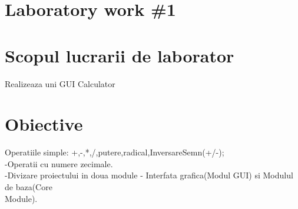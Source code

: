 \section*{Laboratory work \#1}

\section{Scopul lucrarii de laborator}

Realizeaza uni GUI Calculator\\

\section{Obiective}


Operatiile simple: +,-,*,/,putere,radical,InversareSemn(+/-);\\
-Operatii cu numere zecimale.\\
-Divizare proiectului in doua module - Interfata grafica(Modul GUI) si Modulul de baza(Core\\ Module).



\clearpage